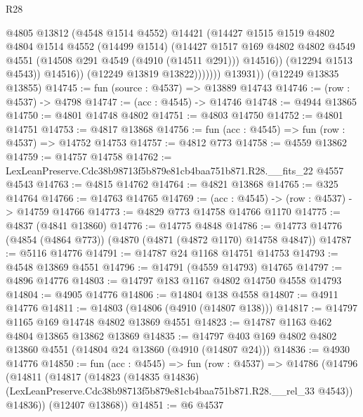 \begin{lexlean}{R28}
\begin{coremodule}
                          @4805
                          @13812
                          (@4548 @1514 @4552)
                          @14421
                          (@14427
                            @1515
                            @1519
                            @4802
                            @4804
                            @1514
                            @4552
                            (@14499 @1514)
                            (@14427
                              @1517
                              @169
                              @4802
                              @4802
                              @4549
                              @4551
                              (@14508 @291 @4549 (@4910 (@14511 @291)))
                              @14516))
                          (@12294 @1513 @4543))
                        @14516))
                    (@12249 @13819 @13822)))))))
        @13931))
    (@12249 @13835 @13855)
@14745 := fun (source : @4537) => @13889 @14743
@14746 := (row : @4537) -> @4798
@14747 := (acc : @4545) -> @14746
@14748 := @4944 @13865
@14750 := @4801 @14748 @4802
@14751 := @4803 @14750
@14752 := @4801 @14751
@14753 := @4817 @13868
@14756 := fun (acc : @4545) => fun (row : @4537) => @14752 @14753
@14757 := @4812 @773
@14758 := @4559 @13862
@14759 := @14757 @14758
@14762 := LexLeanPreserve.Cdc38b98713f5b879e81cb4baa751b871.R28.__fits_22 @4557 @4543
@14763 := @4815 @14762
@14764 := @4821 @13868
@14765 := @325 @14764
@14766 := @14763 @14765
@14769 := (acc : @4545) -> (row : @4537) -> @14759 @14766
@14773 := @4829 @773 @14758 @14766 @1170
@14775 := @4837 (@4841 @13860)
@14776 := @14775 @4848
@14786 := @14773 @14776 (@4854 (@4864 @773)) (@4870 (@4871 (@4872 @1170) @14758 @4847))
@14787 := @5116 @14776
@14791 := @14787 @24 @1168 @14751 @14753
@14793 := @4548 @13869 @4551
@14796 := @14791 (@4559 @14793) @14765
@14797 := @4896 @14776
@14803 := @14797 @183 @1167 @4802 @14750 @4558 @14793
@14804 := @4905 @14776
@14806 := @14804 @138 @4558
@14807 := @4911 @14776
@14811 := @14803 (@14806 (@4910 (@14807 @138)))
@14817 := @14797 @1165 @169 @14748 @4802 @13869 @4551
@14823 := @14787 @1163 @462 @4804 @13865 @13862 @13869
@14835 := @14797 @403 @169 @4802 @4802 @13860 @4551 (@14804 @24 @13860 (@4910 (@14807 @24)))
@14836 := @4930 @14776
@14850 := fun (acc : @4545) =>
  fun (row : @4537) =>
  @14786
    (@14796
      (@14811
        (@14817
          (@14823
            (@14835 @14836)
            (LexLeanPreserve.Cdc38b98713f5b879e81cb4baa751b871.R28.__rel_33 @4543))
          @14836))
      (@12407 @13868))
@14851 := @6 @4537

\end{coremodule}
\end{lexlean}
